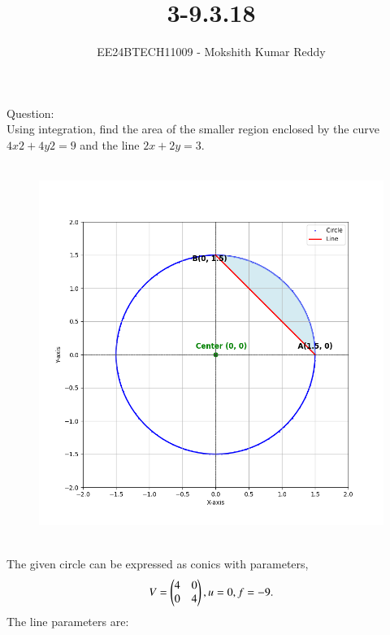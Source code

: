 \documentclass[journal]{IEEEtran}
\begin{document}

\vspace{3cm}

\title{3-9.3.18}
\author{EE24BTECH11009 - Mokshith Kumar Reddy}
{\let\newpage\relax\maketitle}

\renewcommand{\thefigure}{\theenumi}
\renewcommand{\thetable}{\theenumi}
\setlength{\intextsep}{10pt} %


\renewcommand{\thetable}{\theenumi}
Question:\\
Using integration, find the area of the smaller region enclosed by the curve $4x2 + 4y2 = 9$ and the line $2x + 2y = 3$.\\
\solution\\
\begin{figure}[h!]
   \centering
   \includegraphics[width=0.7\linewidth]{figs/plot.png}
   \caption{ }
   \label{plot}
\end{figure}\\
The given circle can be expressed as conics with parameters,\\
\begin{align}
    V=\begin{pmatrix}4 & 0\\0 & 4\end{pmatrix},u=0,f=-9.\\
\end{align}
The line parameters are:\\
\end{document}
